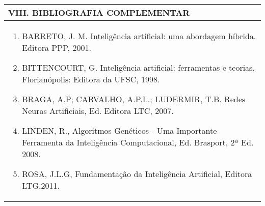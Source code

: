 \documentclass[12pt]{article}
\begin{document}
\begin{longtable}{|L{1.025\textwidth}|} \hline
%
{\bf VIII. BIBLIOGRAFIA COMPLEMENTAR} \\ \hline
\begin{enumerate}
\item BARRETO, J. M. Inteligência artificial: uma abordagem híbrida. Editora PPP, 2001.
\item BITTENCOURT, G. Inteligência artificial: ferramentas e teorias. Florianópolis: Editora da UFSC, 1998.
\item BRAGA, A.P; CARVALHO, A.P.L.; LUDERMIR, T.B. Redes Neuras Artificiais, Ed. Editora LTC, 2007.
\item LINDEN, R., Algoritmos Genéticos - Uma Importante Ferramenta da Inteligência Computacional, Ed. Brasport, 2ª Ed. 2008.
\item ROSA, J.L.G, Fundamentação da Inteligência Artificial, Editora LTG,2011.

%
\end{enumerate}
 \\ \hline
\end{longtable}



\end{document}
